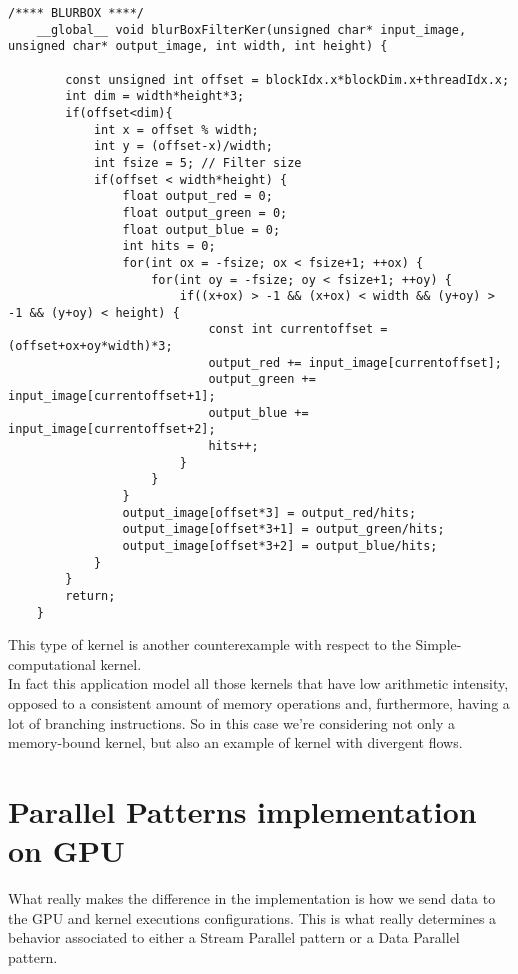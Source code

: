 	\begin{lstlisting}[caption={Implementation for Image processing Kernel (Blur Box Algorithm)}]
	/**** BLURBOX ****/
	__global__ void blurBoxFilterKer(unsigned char* input_image, unsigned char* output_image, int width, int height) {
	
		const unsigned int offset = blockIdx.x*blockDim.x+threadIdx.x;
		int dim = width*height*3;
		if(offset<dim){
			int x = offset % width;
			int y = (offset-x)/width;
			int fsize = 5; // Filter size
			if(offset < width*height) {
				float output_red = 0;
				float output_green = 0;
				float output_blue = 0;
				int hits = 0;
				for(int ox = -fsize; ox < fsize+1; ++ox) {
					for(int oy = -fsize; oy < fsize+1; ++oy) {
						if((x+ox) > -1 && (x+ox) < width && (y+oy) > -1 && (y+oy) < height) {
							const int currentoffset = (offset+ox+oy*width)*3;
							output_red += input_image[currentoffset]; 
							output_green += input_image[currentoffset+1];
							output_blue += input_image[currentoffset+2];
							hits++;
						}
					}
				}
				output_image[offset*3] = output_red/hits;
				output_image[offset*3+1] = output_green/hits;
				output_image[offset*3+2] = output_blue/hits;
			}
		}
		return;
	}
	\end{lstlisting}
	This type of kernel is another counterexample with respect to the Simple-computational kernel.\\
	In fact this application model all those kernels that have low arithmetic intensity, opposed to a consistent amount of memory operations and, furthermore, having a lot of branching instructions. So in this case we're considering not only a memory-bound kernel, but also an example of kernel with divergent flows.
	
	
\section{Parallel Patterns implementation on GPU}
What really makes the difference in the implementation is how we send data to the GPU and kernel executions configurations.
This is what really determines a behavior associated to either a Stream Parallel pattern or a Data Parallel pattern.


